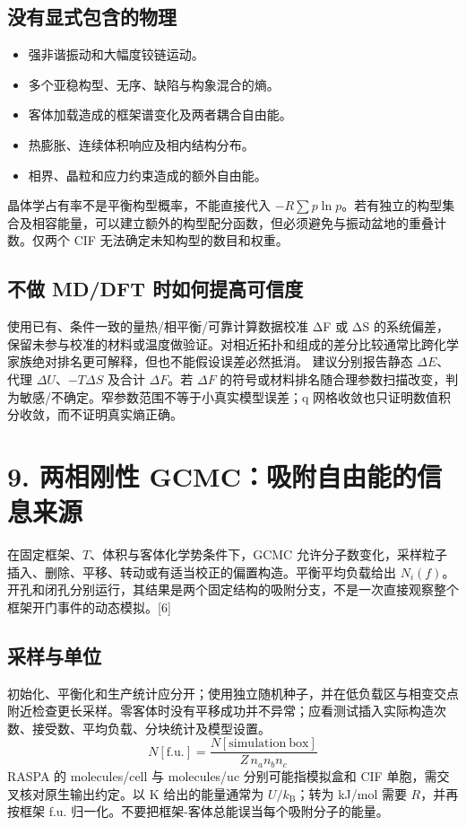 \documentclass[UTF8,a4paper,11pt]{ctexart}
\begin{document}
\subsection*{没有显式包含的物理}
\begin{itemize}[leftmargin=1.7em,itemsep=0.15em,topsep=0.15em]
\item 强非谐振动和大幅度铰链运动。
\item 多个亚稳构型、无序、缺陷与构象混合的熵。
\item 客体加载造成的框架谱变化及两者耦合自由能。
\item 热膨胀、连续体积响应及相内结构分布。
\item 相界、晶粒和应力约束造成的额外自由能。
\end{itemize}
晶体学占有率不是平衡构型概率，不能直接代入 \(-R\sum p\ln p\)。若有独立的构型集合及相容能量，可以建立额外的构型配分函数，但必须避免与振动盆地的重叠计数。仅两个 CIF 无法确定未知构型的数目和权重。
\subsection*{不做 MD/DFT 时如何提高可信度}
使用已有、条件一致的量热/相平衡/可靠计算数据校准 ΔF 或 ΔS 的系统偏差，保留未参与校准的材料或温度做验证。对相近拓扑和组成的差分比较通常比跨化学家族绝对排名更可解释，但也不能假设误差必然抵消。
建议分别报告静态 \(\Delta E\)、代理 \(\Delta U\)、\(-T\Delta S\) 及合计 \(\Delta F\)。若 \(\Delta F\) 的符号或材料排名随合理参数扫描改变，判为敏感/不确定。窄参数范围不等于小真实模型误差；q 网格收敛也只证明数值积分收敛，而不证明真实熵正确。
\clearpage
\section*{9. 两相刚性 GCMC：吸附自由能的信息来源}
在固定框架、\(T\)、体积与客体化学势条件下，GCMC 允许分子数变化，采样粒子插入、删除、平移、转动或有适当校正的偏置构造。平衡平均负载给出 \(N_i(f)\)。开孔和闭孔分别运行，其结果是两个固定结构的吸附分支，不是一次直接观察整个框架开门事件的动态模拟。[6]
\subsection*{采样与单位}
初始化、平衡化和生产统计应分开；使用独立随机种子，并在低负载区与相变交点附近检查更长采样。零客体时没有平移成功并不异常；应看测试插入实际构造次数、接受数、平均负载、分块统计及模型设置。
\begin{equation*}
N[\mathrm{f.u.}]=\frac{N[\mathrm{simulation\ box}]}{Z\,n_a n_b n_c}
\end{equation*}
RASPA 的 molecules/cell 与 molecules/uc 分别可能指模拟盒和 CIF 单胞，需交叉核对原生输出约定。以 K 给出的能量通常为 \(U/k_\mathrm{B}\)；转为 kJ/mol 需要 \(R\)，并再按框架 f.u. 归一化。不要把框架-客体总能误当每个吸附分子的能量。
\end{document}
